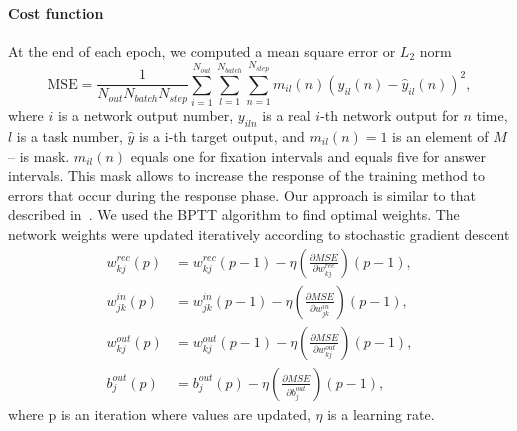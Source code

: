 \documentclass{article}
\begin{document}
\paragraph{Cost function}
At the end of each epoch, we computed a mean square error or $L_2$ norm
\begin{equation}\label{eq:MSE}
    \text{MSE} = \frac{1}{N_{out}N_{batch}N_{step}}\sum_{i=1}^{N_{out}}\sum_{l=1}^{N_{batch}}\sum_{n=1}^{N_{step}}m_{il}(n)(y_{il}(n) - \hat y_{il}(n))^2,
\end{equation}
where $i$ is a network output number, $y_{iln}$ is a real $i$-th network output for $n$ time,  $l$ is a task number, $\hat y$ is a i-th target output, and  $m_{il}(n) = 1$ is an element of $M$ -- is mask. $m_{il}(n)$ equals one for fixation intervals and equals five for answer intervals. This mask allows to increase the response of the training method to errors that occur during the response phase.
Our approach is similar to that described in~\cite{xue2021spiking}. We used the BPTT algorithm to find optimal weights. The network weights were updated iteratively according to stochastic gradient descent
\begin{equation}\label{eq:update_w_rec}
    \begin{aligned}
        w_{kj}^{rec}(p) & = w_{kj}^{rec}(p - 1) - \eta (\frac{\partial MSE}{\partial w_{kj}^{rec}})(p - 1), \\
        w_{jk}^{in}(p)  & = w_{jk}^{in}(p - 1) - \eta (\frac{\partial MSE}{\partial w_{jk}^{in}})(p - 1),   \\
        w_{kj}^{out}(p) & = w_{kj}^{out}(p - 1) - \eta (\frac{\partial MSE}{\partial w_{kj}^{out}})(p - 1), \\
        b_j^{out}(p)    & = b_j^{out}(p) - \eta (\frac{\partial MSE}{\partial b_j^{out}})(p - 1),
    \end{aligned}
\end{equation}
where p is an iteration where values are updated, $\eta$ is a learning rate.
\end{document}
